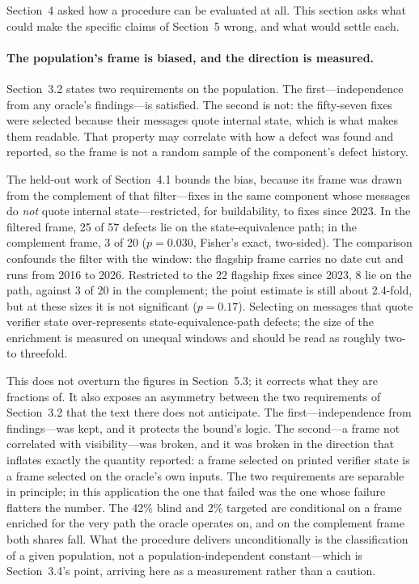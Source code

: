 Section~4 asked how a procedure can be evaluated at all. This section asks what
could make the specific claims of Section~5 wrong, and what would settle each.

\paragraph{The population's frame is biased, and the direction is measured.}
Section~3.2 states two requirements on the population. The first---independence from
any oracle's findings---is satisfied. The second is not: the fifty-seven fixes were
selected because their messages quote internal state, which is what makes them
readable. That property may correlate with how a defect was found and reported, so
the frame is not a random sample of the component's defect history.

The held-out work of Section~4.1 bounds the bias, because its frame was drawn from
the complement of that filter---fixes in the same component whose messages do
\emph{not} quote internal state---restricted, for buildability, to fixes since 2023.
In the filtered frame, 25 of 57 defects lie on the state-equivalence path; in the
complement frame, 3 of 20 ($p = 0.030$, Fisher's exact, two-sided). The comparison
confounds the filter with the window: the flagship frame carries no date cut and runs
from 2016 to 2026. Restricted to the 22 flagship fixes since 2023, 8 lie on the path,
against 3 of 20 in the complement; the point estimate is still about 2.4-fold, but at
these sizes it is not significant ($p = 0.17$). Selecting on messages that quote
verifier state over-represents state-equivalence-path defects; the size of the
enrichment is measured on unequal windows and should be read as roughly two- to
threefold.

This does not overturn the figures in Section~5.3; it corrects what they are
fractions of. It also exposes an asymmetry between the two requirements of
Section~3.2 that the text there does not anticipate. The first---independence from
findings---was kept, and it protects the bound's logic. The second---a frame not
correlated with visibility---was broken, and it was broken in the direction that
inflates exactly the quantity reported: a frame selected on printed verifier state is
a frame selected on the oracle's own inputs. The two requirements are separable in
principle; in this application the one that failed was the one whose failure flatters
the number. The 42\% blind and 2\% targeted are conditional on a frame enriched
for the very path the oracle operates on, and on the complement frame both shares
fall. What the procedure delivers unconditionally is the classification of a given
population, not a population-independent constant---which is Section~3.4's point,
arriving here as a measurement rather than a caution.

